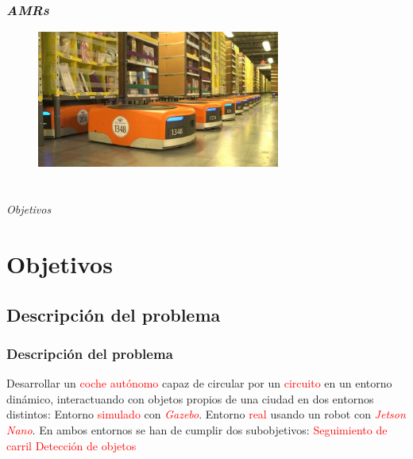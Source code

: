 \documentclass{beamer}
\begin{document}
\begin{frame}
	\frametitle{\textit{AMRs}}
	\begin{figure}
		\centering
		\includegraphics[width=8cm]{figs/kivasystems}
	\end{figure}
\end{frame}


\section*{}
\begin{frame}{}
	\centering \Huge
	\emph{Objetivos}
\end{frame}

\section{Objetivos}
\subsection{Descripción del problema}
\begin{frame}
	\frametitle{Descripción del problema}
	\begin{outline}
		\1 Desarrollar un \textcolor{red}{coche autónomo }capaz de circular por un \textcolor{red}{circuito} en un entorno dinámico, interactuando con objetos propios de
		una ciudad en dos entornos
		distintos:
		\2 Entorno \textcolor{red}{simulado} con \textcolor{red}{\textit{Gazebo}}.
		\2 Entorno \textcolor{red}{real} usando un robot con \textcolor{red}{\textit{Jetson Nano}}.
		\1 En ambos entornos se han de cumplir dos subobjetivos:
		\2 \textcolor{red}{Seguimiento de carril}
		\2 \textcolor{red}{Detección de objetos}
	\end{outline}
\end{frame}
\end{document}
